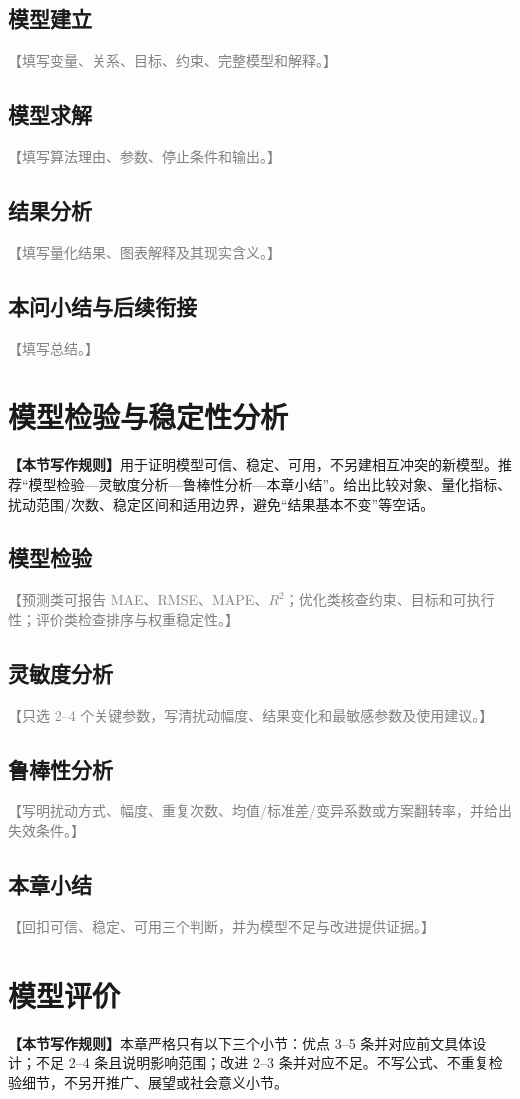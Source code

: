 \documentclass[UTF8,a4paper,12pt]{ctexart}
\numberwithin{equation}{section}
\newcommand{\writingrule}[1]{\par\noindent\begingroup\color{gray}\small\textbf{【本节写作规则】}#1\par\endgroup}
\newcommand{\placeholder}[1]{\textcolor{gray}{【#1】}}
\begin{document}
\subsection{模型建立}\placeholder{填写变量、关系、目标、约束、完整模型和解释。}
\subsection{模型求解}\placeholder{填写算法理由、参数、停止条件和输出。}
\subsection{结果分析}\placeholder{填写量化结果、图表解释及其现实含义。}
\subsection{本问小结与后续衔接}\placeholder{填写总结。}
\fi

\section{模型检验与稳定性分析}
\writingrule{用于证明模型可信、稳定、可用，不另建相互冲突的新模型。推荐“模型检验—灵敏度分析—鲁棒性分析—本章小结”。给出比较对象、量化指标、扰动范围/次数、稳定区间和适用边界，避免“结果基本不变”等空话。}
\subsection{模型检验}
\placeholder{预测类可报告 MAE、RMSE、MAPE、$R^2$；优化类核查约束、目标和可执行性；评价类检查排序与权重稳定性。}
\subsection{灵敏度分析}
\placeholder{只选 2--4 个关键参数，写清扰动幅度、结果变化和最敏感参数及使用建议。}
\subsection{鲁棒性分析}
\placeholder{写明扰动方式、幅度、重复次数、均值/标准差/变异系数或方案翻转率，并给出失效条件。}
\subsection{本章小结}
\placeholder{回扣可信、稳定、可用三个判断，并为模型不足与改进提供证据。}

\section{模型评价}
\writingrule{本章严格只有以下三个小节：优点 3--5 条并对应前文具体设计；不足 2--4 条且说明影响范围；改进 2--3 条并对应不足。不写公式、不重复检验细节，不另开推广、展望或社会意义小节。}
\end{document}
